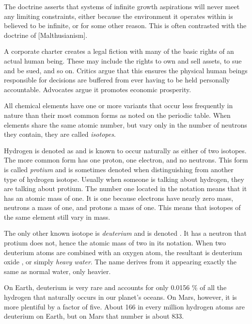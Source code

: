 The doctrine asserts that systems of infinite growth aspirations will never meet any limiting constraints, either because the environment it operates within is believed to be infinite, or for some other reason. This is often contrasted with the doctrine of [Malthusianism].
\stopdefinition

A corporate charter creates a legal fiction with many of the basic rights of an actual human being. These may include the rights to own and sell assets, to sue and be sued, and so on. Critics argue that this ensures the physical human beings responsible for decisions are buffered from ever having to be held personally accountable. Advocates argue it promotes economic prosperity.
\stopdefinition

All chemical elements have one or more variants that occur less frequently in nature than their most common forms as noted on the periodic table. When elements share the same atomic number, but vary only in the number of neutrons they contain, they are called {\it isotopes}.

Hydrogen is denoted as  and is known to occur naturally as either of two isotopes. The more common form has one proton, one electron, and no neutrons. This form is called {\it protium} and is sometimes denoted  when distinguishing from another type of hydrogen isotope. Usually when someone is talking about hydrogen, they are talking about protium. The number one located in the notation means that it has an atomic mass of one. It is one because electrons have nearly zero mass, neutrons a mass of one, and protons a mass of one. This means that isotopes of the same element still vary in mass.

The only other known isotope is {\it deuterium} and is denoted . It has a neutron that protium does not, hence the atomic mass of two in its notation. When two deuterium atoms are combined with an oxygen atom, the resultant is deuterium oxide , or simply {\it heavy water}. The name derives from it appearing exactly the same as normal water, only heavier.

On Earth, deuterium is very rare and accounts for only 0.0156 \% of all the hydrogen that naturally occurs in our planet's oceans. On Mars, however, it is more plentiful by a factor of five. About 166 in every million hydrogen atoms are deuterium on Earth, but on Mars that number is about 833. 

